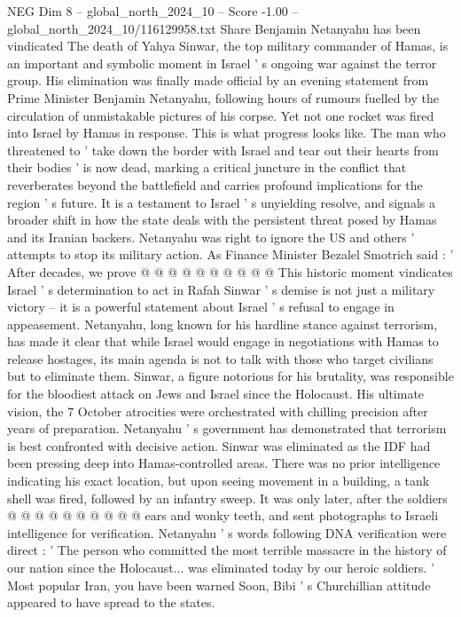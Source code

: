 \begin{textsample}{NEG Dim 8 – global\_north\_2024\_10 – Score -1.00 – global\_north\_2024\_10/116129958.txt}  \label{ex:f8_neg_300}
Share Benjamin Netanyahu has been vindicated The death of Yahya Sinwar, the top military commander of Hamas, is an important and symbolic moment in Israel ' s ongoing war against the terror group.
His elimination was finally made official by an evening statement from Prime Minister Benjamin Netanyahu, following hours of rumours fuelled by the circulation of unmistakable pictures of his corpse.
Yet not one rocket was fired into Israel by Hamas in response.
This is what progress looks like.
The man who threatened to ' take down the border with Israel and tear out their hearts from their bodies ' is now dead, marking a critical juncture in the conflict that reverberates beyond the battlefield and carries profound implications for the region ' s future.
It is a testament to Israel ' s unyielding resolve, and signals a broader shift in how the state deals with the persistent threat posed by Hamas and its Iranian backers.
Netanyahu was right to ignore the US and others ' attempts to stop its military action.
As Finance Minister Bezalel Smotrich said : ' After decades, we prove @ @ @ @ @ @ @ @ @ @ This historic moment vindicates Israel ' s determination to act in Rafah Sinwar ' s demise is not just a military victory -- it is a powerful statement about Israel ' s refusal to engage in appeasement.
Netanyahu, long known for his hardline stance against terrorism, has made it clear that while Israel would engage in negotiations with Hamas to release hostages, its main agenda is not to talk with those who target civilians but to eliminate them.
Sinwar, a figure notorious for his brutality, was responsible for the bloodiest attack on Jews and Israel since the Holocaust.
His ultimate vision, the 7 October atrocities were orchestrated with chilling precision after years of preparation.
Netanyahu ' s government has demonstrated that terrorism is best confronted with decisive action.
Sinwar was eliminated as the IDF had been pressing deep into Hamas-controlled areas.
There was no prior intelligence indicating his exact location, but upon seeing movement in a building, a tank shell was fired, followed by an infantry sweep.
It was only later, after the soldiers @ @ @ @ @ @ @ @ @ @ ears and wonky teeth, and sent photographs to Israeli intelligence for verification.
Netanyahu ' s words following DNA verification were direct : ' The person who committed the most terrible massacre in the history of our nation since the Holocaust... was eliminated today by our heroic soldiers. ' Most popular Iran, you have been warned Soon, Bibi ' s Churchillian attitude appeared to have spread to the states.

\end{textsample}
